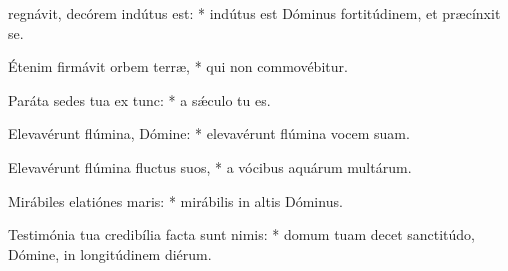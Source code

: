 \begin{psalmus}

 regnávit, decórem indútus est: * indútus est Dóminus fortitúdinem, et præcínxit se.

Étenim firmávit orbem terræ, * qui non commovébitur.

Paráta sedes tua ex tunc: * a sǽculo tu es.

Elevavérunt flúmina, Dómine: * elevavérunt flúmina vocem suam.

Elevavérunt flúmina fluctus suos, * a vócibus aquárum multárum.

Mirábiles elatiónes maris: * mirábilis in altis Dóminus.

Testimónia tua credibília facta sunt nimis: * domum tuam decet sanctitúdo, Dómine, in longitúdinem diérum. 

\end{psalmus}
